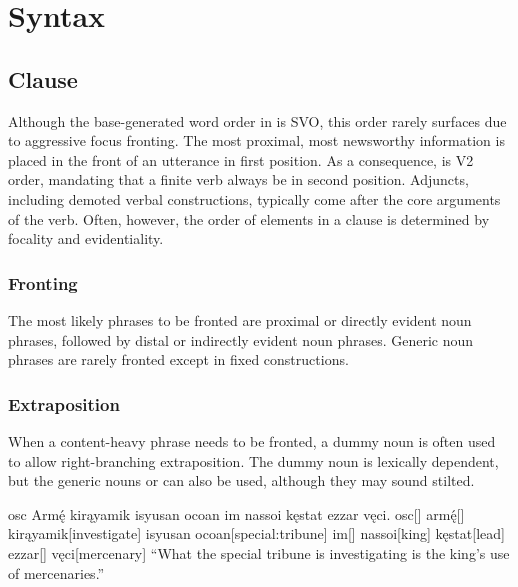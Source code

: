 \setchapterpreamble[u]{\margintoc}
\chapter{Syntax}
\section{Clause}
Although the base-generated word order in \langname{} is SVO, this order rarely surfaces due to aggressive focus fronting. The most proximal, most newsworthy information is placed in the front of an utterance in first position. As a consequence, \langname{} is V2 order, mandating that a finite verb always be in second position. Adjuncts, including demoted verbal constructions, typically come after the core arguments of the verb.  Often, however, the order of elements in a clause is determined by focality and evidentiality.

\subsection{Fronting}
The most likely phrases to be fronted are proximal or directly evident noun phrases, followed by distal or indirectly evident noun phrases. Generic noun phrases are rarely fronted except in fixed constructions.

\subsection{Extraposition}
When a content-heavy phrase needs to be fronted, a dummy noun is often used to allow right-branching extraposition. The dummy noun is lexically dependent, but the generic nouns  or  can also be used, although they may sound stilted.

\begin{gloss*}
    \begingl
        \glpreamble osc Armę́ kirąyamik isyusan ocoan im nassoi kęstat ezzar vęci. \endpreamble
            osc[]
            armę́[]
            kirąyamik[investigate]
            {isyusan ocoan}[special:tribune]
            im[]
            nassoi[king]
            kęstat[lead]
            ezzar[]
            vęci[mercenary]
        \glft “What the special tribune is investigating is the king's use of mercenaries.”
    \endgl
\end{gloss*}

